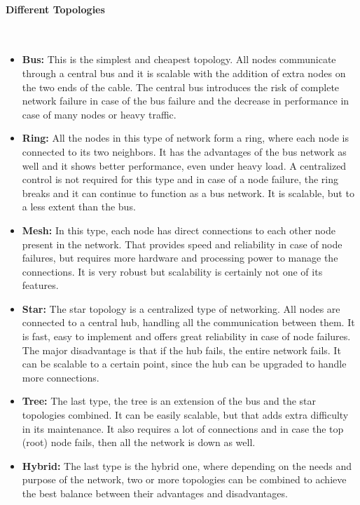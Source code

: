 \paragraph{Different Topologies}~\\
\begin{itemize}
\item \textbf{Bus:} This is the simplest and cheapest topology.
All nodes communicate through a central bus and it is scalable with the addition of extra nodes on the two ends of the cable.
The central bus introduces the risk of complete network failure in case of the bus failure and the decrease in performance in case of many nodes or heavy traffic.
\item \textbf{Ring:} All the nodes in this type of network form a ring, where each node is connected to its two neighbors.
It has the advantages of the bus network as well and it shows better performance, even under heavy load.
A centralized control is not required for this type and in case of a node failure, the ring breaks and it can continue to function as a bus network.
It is scalable, but to a less extent than the bus.
\item \textbf{Mesh:} In this type, each node has direct connections to each other node present in the network.
That provides speed and reliability in case of node failures, but requires more hardware and processing power to manage the connections.
It is very robust but scalability is certainly not one of its features.
\item \textbf{Star:} The star topology is a centralized type of networking.
All nodes are connected to a central hub, handling all the communication between them.
It is fast, easy to implement and offers great reliability in case of node failures.
The major disadvantage is that if the hub fails, the entire network fails.
It can be scalable to a certain point, since the hub can be upgraded to handle more connections.
\item \textbf{Tree:} The last type, the tree is an extension of the bus and the star topologies combined.
It can be easily scalable, but that adds extra difficulty in its maintenance.
It also requires a lot of connections and in case the top (root) node fails, then all the network is down as well.
\item \textbf{Hybrid:} The last type is the hybrid one, where depending on the needs and purpose of the network, two or more topologies can be combined to achieve the best balance between their advantages and disadvantages.
\end{itemize}

